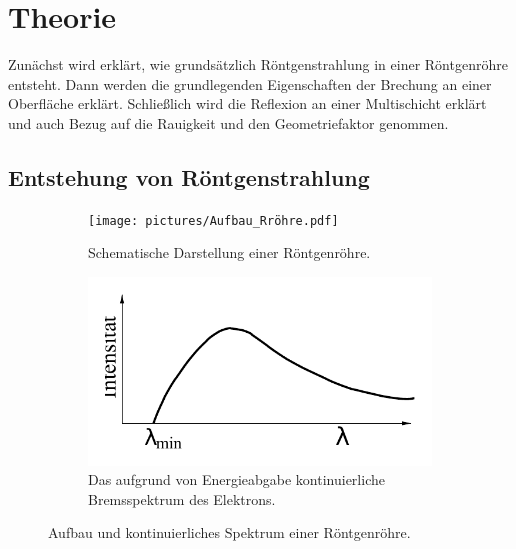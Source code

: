 \section{Theorie}
\label{sec:Theorie}

Zunächst wird erklärt, wie grundsätzlich Röntgenstrahlung in einer Röntgenröhre entsteht.
Dann werden die grundlegenden Eigenschaften der Brechung an einer Oberfläche erklärt.
Schließlich wird die Reflexion an einer Multischicht erklärt und auch Bezug auf die Rauigkeit und den Geometriefaktor genommen.

\subsection{Entstehung von Röntgenstrahlung} \label{sec:Röntgenstrahlung}

\begin{figure}
    \begin{subfigure}{0.48\textwidth}
        \centering
        \texttt{[image: pictures/Aufbau\_Rröhre.pdf]}
        \caption{Schematische Darstellung einer Röntgenröhre. \cite{demtroeder2}}
        \label{fig:aufbau}
    \end{subfigure}
    \begin{subfigure}{0.48\textwidth}
        \centering
        \includegraphics[width=\textwidth]{pictures/bremsspektrum.pdf}
        \caption{Das aufgrund von Energieabgabe kontinuierliche Bremsspektrum des Elektrons. \cite{v602}}
        \label{fig:bremsspektrum}
    \end{subfigure}
    \caption{Aufbau und kontinuierliches Spektrum einer Röntgenröhre.}
\end{figure}

